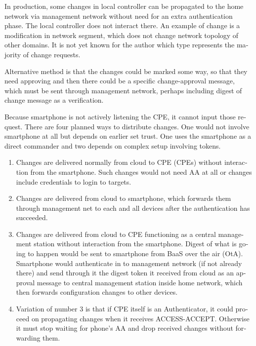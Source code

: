 \documentclass[12pt,a4paper,english]{tutthesis}
\begin{document}
\begin{otherlanguage}{english}
In production, some changes in local controller can be propagated to
the home network via management network without need for an extra
authentication phase.  The local controller does not interact
there. An example of change is a modification in network segment,
which does not change network topology of other domains.
It is not yet known for the author which type represents the majority of
change requests.







Alternative method is that the changes could be marked some way, so that they need
approving and then there could be a specific change-approval message,
which must be sent through management network, perhaps including digest
of change message as a verification.

Because smartphone is not actively listening the CPE, it cannot input
those request. There are four planned ways to distribute changes. One
would not involve smartphone at all but depends on earlier set
trust. One uses the smartphone as a direct commander and two depends
on complex setup involving tokens.

\begin{enumerate}
\item Changes are delivered normally from cloud to CPE (CPEs) without
interaction from the smartphone. Such changes would not need
AA at all or changes include credentials to login to targets.

\item Changes are delivered from cloud to smartphone, which
forwards them through management
net to each and all devices after the authentication has succeeded.

\item Changes are delivered from cloud to CPE functioning as a central
management station without interaction from the smartphone.  Digest
of what is going to happen would be sent to smartphone from BaaS
over the air (OtA). Smartphone would authenticate in to management
network (if not already there) and send through it the digest token
it received from cloud as an approval message to central management
station inside home network, which then forwards configuration changes
to other devices.

\item Variation of number 3 is that if CPE itself is an Authenticator, it
could proceed on propagating changes when it receives
ACCESS-ACCEPT. Otherwise it must stop waiting for phone's AA and
drop received changes without forwarding them.
\end{enumerate}





\end{otherlanguage}
\end{document}
